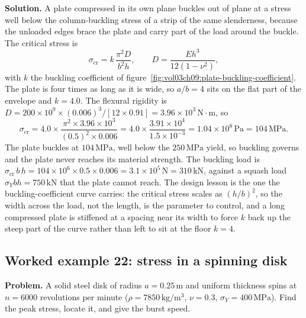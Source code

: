 \textbf{Solution.} A plate compressed in its own plane buckles out of plane
at a stress well below the column-buckling stress of a strip of the same
slenderness, because the unloaded edges brace the plate and carry part of
the load around the buckle. The critical stress is
\[
\sigma_{\text{cr}} = k\,\frac{\pi^2 D}{b^2 h},
\qquad D = \frac{E h^3}{12(1-\nu^2)},
\]
with $k$ the buckling coefficient of
figure~\ref{fig:vol03ch09:plate-buckling-coefficient}. The plate is four
times as long as it is wide, so $a/b = 4$ sits on the flat part of the
envelope and $k = 4.0$. The flexural rigidity is $D = 200\times 10^9\times
(0.006)^3/[12\times 0.91] = 3.96\times 10^3\,\text{N}\cdot\text{m}$, so
\[
\sigma_{\text{cr}} = 4.0\times \frac{\pi^2 \times 3.96\times 10^3}
{(0.5)^2 \times 0.006}
= 4.0\times \frac{3.91\times 10^4}{1.5\times 10^{-3}}
= 1.04\times 10^{8}\,\text{Pa} = 104\,\text{MPa}.
\]
The plate buckles at $104\,\text{MPa}$, well below the $250\,\text{MPa}$
yield, so buckling governs and the plate never reaches its material
strength. The buckling load is $\sigma_{\text{cr}}\,b\,h = 104\times 10^6
\times 0.5\times 0.006 = 3.1\times 10^5\,\text{N} = 310\,\text{kN}$,
against a squash load $\sigma_Y b h = 750\,\text{kN}$ that the plate cannot
reach. The design lesson is the one the buckling-coefficient curve carries:
the critical stress scales as $(h/b)^2$, so the width across the load, not
the length, is the parameter to control, and a long compressed plate is
stiffened at a spacing near its width to force $k$ back up the steep part
of the curve rather than left to sit at the floor $k=4$.

\subsection*{Worked example 22: stress in a spinning disk}



\textbf{Problem.} A solid steel disk of radius $a = 0.25\,\si{\meter}$ and
uniform thickness spins at $n = 6000$ revolutions per minute ($\rho =
7850\,\si{\kilogram\per\meter\cubed}$, $\nu = 0.3$, $\sigma_Y = 400\,
\text{MPa}$). Find the peak stress, locate it, and give the burst speed.

